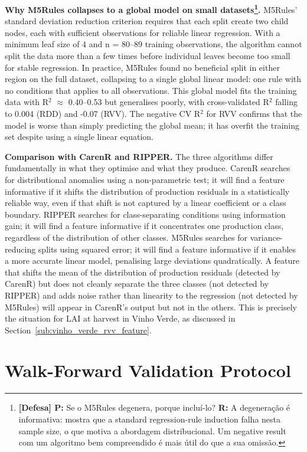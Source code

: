 \textbf{Why M5Rules collapses to a global model on small datasets\footnote{\textbf{[Defesa] P:} Se o M5Rules degenera, porque incluí-lo? \textbf{R:} A degeneração é informativa: mostra que a standard regression-rule induction falha nesta sample size, o que motiva a abordagem distribucional. Um negative result com um algoritmo bem compreendido é mais útil do que a sua omissão.}. }M5Rules' standard deviation reduction criterion requires that each split create two child nodes, each with sufficient observations for reliable linear regression. With a minimum leaf size of 4 and n = 80--89 training observations, the algorithm cannot split the data more than a few times before individual leaves become too small for stable regression. In practice, M5Rules found no beneficial split in either region on the full dataset, collapsing to a single global linear model: one rule with no conditions that applies to all observations. This global model fits the training data with R$^2$ $\approx$ 0.40--0.53 but generalises poorly, with cross-validated R$^2$ falling to 0.004 (RDD) and -0.07 (RVV). The negative CV R$^2$ for RVV confirms that the model is worse than simply predicting the global mean; it has overfit the training set despite using a single linear equation.

\textbf{Comparison with CarenR and RIPPER. }The three algorithms differ fundamentally in what they optimise and what they produce. CarenR searches for distributional anomalies using a non-parametric test; it will find a feature informative if it shifts the distribution of production residuals in a statistically reliable way, even if that shift is not captured by a linear coefficient or a class boundary. RIPPER searches for class-separating conditions using information gain; it will find a feature informative if it concentrates one production class, regardless of the distribution of other classes. M5Rules searches for variance-reducing splits using squared error; it will find a feature informative if it enables a more accurate linear model, penalising large deviations quadratically. A feature that shifts the mean of the distribution of production residuals (detected by CarenR) but does not cleanly separate the three classes (not detected by RIPPER) and adds noise rather than linearity to the regression (not detected by M5Rules) will appear in CarenR's output but not in the others. This is precisely the situation for LAI at harvest in Vinho Verde, as discussed in Section~\ref{sub:vinho_verde_rvv_feature}.


\section{Walk-Forward Validation Protocol}\label{sec:walkforward_validation_protocol}

